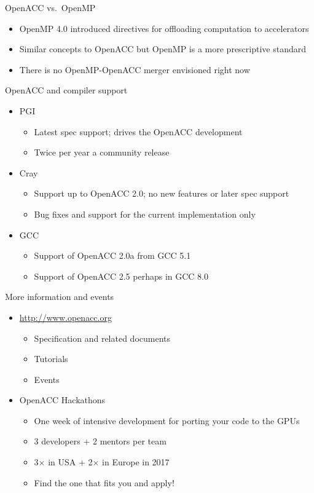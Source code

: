 \documentclass[12pt,aspectratio=169]{beamer}
\begin{document}
\begin{frame}{OpenACC vs.\ OpenMP}
  \begin{itemize}
  \item OpenMP 4.0 introduced directives for offloading computation to accelerators
  \item Similar concepts to OpenACC but OpenMP is a more prescriptive standard
  \item There is no OpenMP-OpenACC merger envisioned right now
  \end{itemize}

  \vfill
  OpenACC and compiler support
  \begin{itemize}
  \item PGI
    \begin{itemize}
    \item Latest spec support; drives the OpenACC development
    \item Twice per year a community release
    \end{itemize}
  \item Cray
    \begin{itemize}
    \item Support up to OpenACC 2.0; no new features or later spec support
    \item Bug fixes and support for the current implementation only
    \end{itemize}
  \item GCC
    \begin{itemize}
    \item Support of OpenACC 2.0a from GCC 5.1
    \item Support of OpenACC 2.5 perhaps in GCC 8.0
    \end{itemize}
  \end{itemize}
\end{frame}

\begin{frame}{More information and events}
  \begin{itemize}
  \item \url{http://www.openacc.org}
    \begin{itemize}
    \item Specification and related documents
    \item Tutorials
    \item Events
    \end{itemize}
    \vfill
  \item OpenACC Hackathons
    \begin{itemize}
    \item One week of intensive development for porting your code to the GPUs
    \item 3 developers + 2 mentors per team
    \item 3$\times$ in USA + 2$\times$ in Europe in 2017
    \item Find the one that fits you and apply!
    \end{itemize}
  \end{itemize}
\end{frame}
\end{document}
